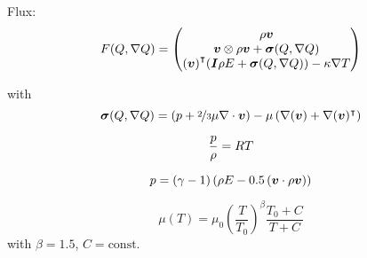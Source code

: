 Flux:
\begin{equation}
  F(Q, \nabla Q) = 
  \begin{pmatrix}
    \rho \bm{v} \\
    \bm{v}  \otimes \rho \bm{v} + \bm{\sigma} (Q, \nabla Q)  \\
    {\left( \bm{v}  \right)}^\intercal (\bm{I} \rho E + \bm{\sigma} (Q, \nabla Q)) - \kappa \nabla T
  \end{pmatrix}
\end{equation}

with
\begin{equation}
  \label{eq:stress-tensor}
  \bm{\sigma}(Q, \nabla Q) = \left(p + \nicefrac{2}{3} \mu \nabla \cdot \bm{v} \right) -
  \mu \left( \nabla (\bm{v}) + \nabla ( \bm{v} )^\intercal \right)
\end{equation}

\begin{equation}
 \frac{p}{\rho} = RT
\end{equation}

\begin{equation}
  p = (\gamma - 1) \left(\rho E - 0.5 \left(\bm{v} \cdot \rho \bm{v} \right) \right)
\end{equation}

\begin{equation}
  \label{eq:sutherland}
 \mu(T)  = \mu_0 {\left(\frac{T}{T_0}  \right)}^{\beta} \frac{T_0 + C}{T + C}
\end{equation}
with \(\beta = 1.5\), \(C = \text{const.}\)
